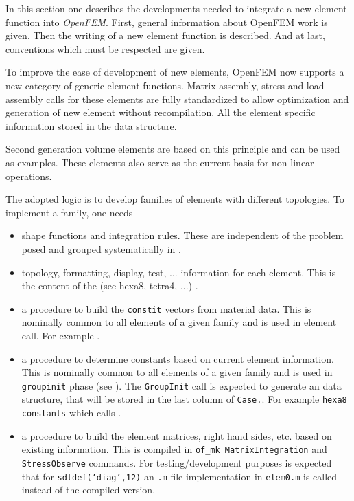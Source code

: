 \newpage{}%

In this section one describes the developments needed to integrate a new element function into {\sl OpenFEM}.  First, general information about OpenFEM work is given. Then the writing of a new element function is described. And at last, conventions which must be respected are given. 

%

To improve the ease of development of new elements, OpenFEM now supports a new category of generic element functions. Matrix assembly, stress and load assembly calls for these elements are fully standardized to allow optimization and generation of new element without recompilation. All the element specific information stored in the  data structure. 

Second generation volume elements are based on this principle and can be used as examples. These elements also serve as the current basis for non-linear operations.

The adopted logic is to develop families of elements with different topologies. To implement a family, one needs

\begin{itemize}
 \item shape functions and integration rules. These are independent of the problem posed and grouped systematically in \integrules.
 \item topology, formatting, display, test, ... information for each element. This is the content of the  (see hexa8, tetra4, ...) .
 \item a procedure to build the {\tt constit} vectors from material data. This is nominally common to all elements of a given family and is used in  element call. For example \texline {}.
 \item a procedure to determine constants based on current element information. This is nominally common to all elements of a given family and is used in {\tt groupinit} phase (see \femk). The {\tt GroupInit} call is expected to generate an  data structure, that will be stored in the last column of {\tt Case.}. For example {\tt hexa8 constants} which calls \texline {}. 
 \item a procedure to build the element matrices, right hand sides, etc. based on existing information. This is compiled in {\tt of\_mk MatrixIntegration} and 
{\tt StressObserve} commands. For testing/development purposes is expected that for {\tt sdtdef('diag',12)} an {\tt .m} file implementation in {\tt elem0.m} is called instead of the compiled version.
\end{itemize}

